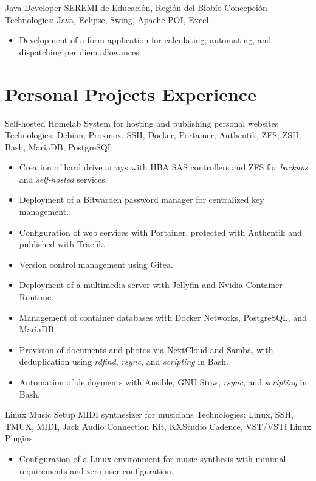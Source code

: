 \documentclass[12pt,letterpaper,sans]{moderncv}
\begin{document}
{Java Developer}
{SEREMI de Educación, Región del Biobío}
{\newline Concepción}
{\newline Technologies: Java, Eclipse, Swing, Apache POI, Excel.}
{
  \begin{itemize}
    \item Development of a form application for calculating, automating, and dispatching per diem allowances.
  \end{itemize}
}
\vspace{0.5em}

\newpage

\section{Personal Projects Experience}

\cventry{}
{Self-hosted Homelab}
{System for hosting and publishing personal websites}
{\newline Technologies: Debian, Proxmox, SSH, Docker, Portainer, Authentik, ZFS, ZSH, Bash, MariaDB, PostgreSQL}
{\newline}
{
  \begin{itemize}
    \item Creation of hard drive arrays with HBA SAS controllers and ZFS for \textit{backups} and \textit{self-hosted} services.
    \item Deployment of a Bitwarden password manager for centralized key management.
    \item Configuration of web services with Portainer, protected with Authentik and published with Traefik.
    \item Version control management using Gitea.
    \item Deployment of a multimedia server with Jellyfin and Nvidia Container Runtime.
    \item Management of container databases with Docker Networks, PostgreSQL, and MariaDB.
    \item Provision of documents and photos via NextCloud and Samba, with deduplication using \textit{rdfind}, \textit{rsync}, and \textit{scripting} in Bash.
    \item Automation of deployments with Ansible, GNU Stow, \textit{rsync}, and \textit{scripting} in Bash.
  \end{itemize}
}
\vspace{0.5em}

\cventry{}
{Linux Music Setup}
{MIDI synthesizer for musicians}
{\newline Technologies: Linux, SSH, TMUX, MIDI, Jack Audio Connection Kit, KXStudio Cadence, VST/VSTi Linux Plugins}
{\newline}
{
  \begin{itemize}
    \item Configuration of a Linux environment for music synthesis with minimal requirements and zero user configuration.
  \end{itemize}
}
\vspace{0.5em}
\end{document}
